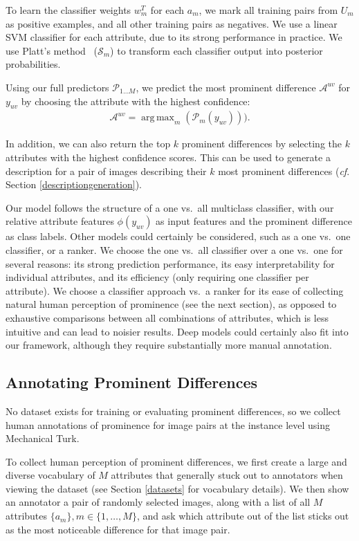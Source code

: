 \documentclass[10pt,twocolumn,letterpaper]{article}
\DeclareMathOperator*{\argmax}{arg\,max}
\begin{document}
To learn the classifier weights $w_m^T$ for each $a_m$, we mark all training pairs from $U_m$ as positive examples, and all other training pairs as negatives. We use a linear SVM classifier for each attribute, due to its strong performance in practice. We use Platt's method~\cite{plattscaling} ($\mathcal{S}_m$) to transform each classifier output into posterior probabilities.

Using our full predictors $\mathcal{P}_{1 \dotsc M}$, we predict the most prominent difference $\mathcal{A}^{uv}$ for $y_{uv}$ by choosing the attribute with the highest confidence:
\begin{align}
    \mathcal{A}^{uv} = \argmax_m(\mathcal{P}_m(y_{uv}))).
\end{align}

In addition, we can also return the top $k$ prominent differences by selecting the $k$ attributes with the highest confidence scores. This can be used to generate a description for a pair of images describing their $k$ most prominent differences (\textit{cf}. Section \ref{descriptiongeneration}).

Our model follows the structure of a one vs.~all multiclass classifier, with our relative attribute features $\phi(y_{uv})$ as input features and the prominent difference as class labels. Other models could certainly be considered, such as a one vs.~one classifier, or a ranker. We choose the one vs.~all classifier over a one vs.~one for several reasons: its strong prediction performance, its easy interpretability for individual attributes, and its efficiency (only requiring one classifier per attribute). We choose a classifier approach vs.~a ranker for its ease of collecting natural human perception of prominence (see the next section), as opposed to exhaustive comparisons between all combinations of attributes, which is less intuitive and can lead to noisier results. Deep models could certainly also fit into our framework, although they require substantially more manual annotation.

\subsection{Annotating Prominent Differences} \label{annotating}

No dataset exists for training or evaluating prominent differences, so we collect human annotations of prominence for image pairs at the instance level using Mechanical Turk.

To collect human perception of prominent differences, we first create a large and diverse vocabulary of $M$ attributes that generally stuck out to annotators when viewing the dataset (see Section \ref{datasets} for vocabulary details). We then show an annotator a pair of randomly selected images, along with a list of all $M$ attributes $\{a_m\}, m \in \{1, \dotsc, M\}$, and ask which attribute out of the list sticks out as the most noticeable difference for that image pair.
\end{document}
